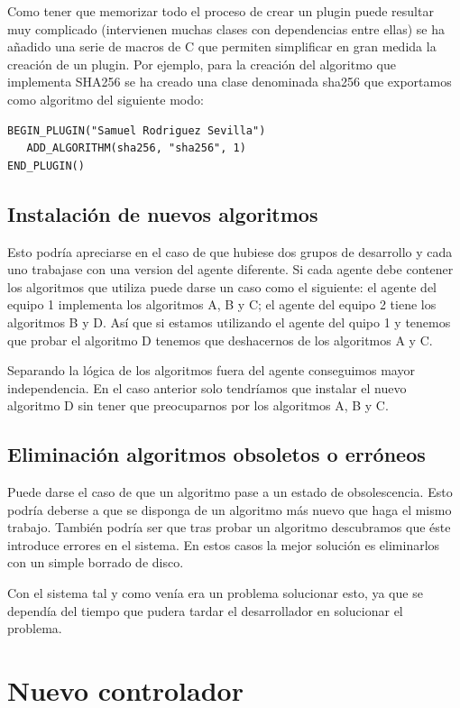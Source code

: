 Como tener que memorizar todo el proceso de crear un plugin puede resultar muy complicado (intervienen muchas clases con dependencias entre ellas) se ha añadido una serie de macros de C que permiten simplificar en gran medida la creación de un plugin. Por ejemplo, para la creación del algoritmo que implementa SHA256 se ha creado una clase denominada sha256 que exportamos como algoritmo del siguiente modo:

\begin{verbatim}
BEGIN_PLUGIN("Samuel Rodriguez Sevilla")
   ADD_ALGORITHM(sha256, "sha256", 1)
END_PLUGIN()
\end{verbatim}


\subsection{Instalación de nuevos algoritmos}

Esto podría apreciarse en el caso de que hubiese dos grupos de desarrollo y cada uno trabajase con una version del agente diferente. Si cada agente debe contener los algoritmos que utiliza puede darse un caso como el siguiente: el agente del equipo 1 implementa los algoritmos A, B y C; el agente del equipo 2 tiene los algoritmos B y D. Así que si estamos utilizando el agente del quipo 1 y tenemos que probar el algoritmo D tenemos que deshacernos de los algoritmos A y C.

Separando la lógica de los algoritmos fuera del agente conseguimos mayor independencia. En el caso anterior solo tendríamos que instalar el nuevo algoritmo D sin tener que preocuparnos por los algoritmos A, B y C.

\subsection{Eliminación algoritmos obsoletos o erróneos}

Puede darse el caso de que un algoritmo pase a un estado de obsolescencia. Esto podría deberse a que se disponga de un algoritmo más nuevo que haga el mismo trabajo. También podría ser que tras probar un algoritmo descubramos que éste introduce errores en el sistema. En estos casos la mejor solución es eliminarlos con un simple borrado de disco.

Con el sistema tal y como venía era un problema solucionar esto, ya que se dependía del tiempo que pudera tardar el desarrollador en solucionar el problema.

\section{Nuevo controlador}

